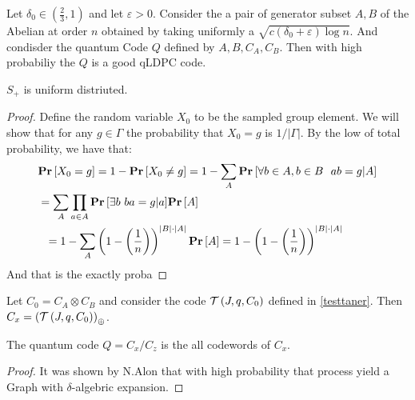 \begin{theorem*} 
Let $\delta_{0} \in \left( \frac{2}{3} ,1 \right)$ and let $\varepsilon > 0$. Consider the a pair of generator subset $A,B$ of the Abelian at order $n$ obtained by taking uniformly a $ \sqrt{ c\left( \delta_{0} + \varepsilon \right)\log n }$. And condisder the quantum Code $Q$ defined by $A,B,C_{A},C_{B}$.  Then with high probabiliy the $Q$ is a good qLDPC code.
\end{theorem*}
\begin{claim} \label{unif}
  $S_{+}$ is uniform distriuted. 
\end{claim}
\begin{proof}
  Define the random variable $X_{0}$ to be the sampled group element. We will show that for any $g \in \Gamma $ the probability that $X_{0} = g$ is $1/|\Gamma|$. By the low of total probability, we have that:     
  \begin{equation*}
    \begin{split}
      & \mathbf{Pr} \left[ {X_{0} = g} \right] = 1 -  \mathbf{Pr} \left[ {X_{0} \neq  g} \right] = 1 - \sum_{A}{ \mathbf{Pr} \left[ { \forall b \in A, b \in B \ \ ab = g | A } \right] } \\ & =  \sum_{A}{ \prod_{a\in A} {\mathbf{Pr} \left[ { \exists b \  ba= g | a } \right] } \mathbf{Pr} \left[ { A } \right]  } \\ 
      & \ \ =  1-  \sum_{A}{  \left( 1 -   \left( \frac{1}{n} \right) \right)^{|B| \cdot |A| }   \mathbf{Pr} \left[ { A } \right]  } = 1 -  \left( 1 -   \left( \frac{1}{n} \right) \right)^{|B| \cdot |A| } 
    \end{split}
  \end{equation*}
  And that is the exactly proba
\end{proof}
\begin{claim}
  Let $C_{0} = C_{A}\otimes C_{B}$ and consider the code $\mathcal{T}\left(J, q , C_{0}\right)$ defined in \ref{testtaner}. Then $C_{x} = \left( \mathcal{T}\left(J, q , C_{0}\right) \right)_{\oplus}$. 
\end{claim}
\begin{claim}
  The quantum code $Q = C_{x}/ C_{z}$ is the all \ireducable codewords of $C_{x}$.   
\end{claim}
\begin{proof}
  It was shown by N.Alon \cite{Noga}  that with high probability that process yield a Graph with $\delta$-algebric expansion.
  \end{proof}
